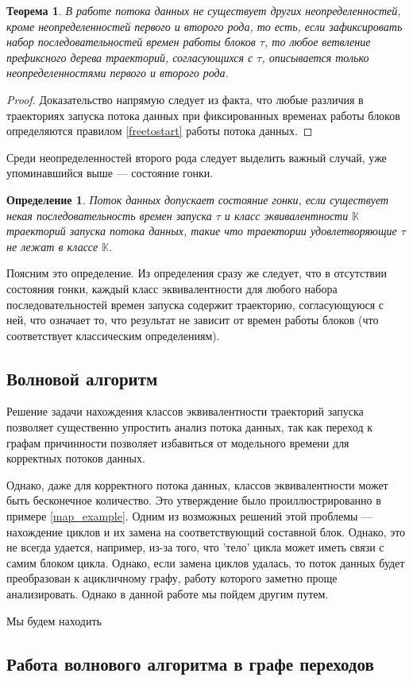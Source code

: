 \documentclass[10pt,a4paper]{article}
\newtheorem{defen}{Определение}
\newtheorem{theorem}{Теорема}
\begin{document}
  \begin{theorem}
    В работе потока данных не существует других неопределенностей, кроме неопределенностей первого и второго рода, то есть,
    если зафиксировать набор последовательностей времен работы блоков $\tau$, то любое ветвление префиксного дерева траекторий, согласующихся с $\tau$,
    описывается только неопределенностями первого и второго рода.
  \end{theorem}
  \begin{proof}
    Доказательство напрямую следует из факта, что любые различия в траекториях запуска потока данных при фиксированных временах работы блоков определяются
    правилом \eqref{freetostart} работы потока данных.
  \end{proof}
  
  Среди неопределенностей второго рода следует выделить важный случай, уже упоминавшийся выше --- состояние гонки.
  
  \begin{defen}
    Поток данных допускает состояние гонки, если существует некая последовательность времен запуска $\tau$ и класс эквивалентности $\mathbb{K}$
    траекторий запуска потока данных, такие что траектории удовлетворяющие $\tau$ не лежат в классе $\mathbb{K}$.
  \end{defen}
  
  Поясним это определение. Из определения сразу же следует, что в отсутствии состояния гонки, каждый класс эквивалентности для любого набора последовательностей
  времен запуска содержит траекторию, согласующуюся с ней, что означает то,
  что результат не зависит от времен работы блоков (что соответствует классическим определениям).
  
\subsection{Волновой алгоритм}  
  Решение задачи нахождения классов эквивалентности траекторий запуска позволяет существенно упростить анализ потока данных, так как
  переход к графам причинности позволяет избавиться от модельного времени для корректных потоков данных.
  
  Однако, даже для корректного потока данных, классов эквивалентности может быть бесконечное количество. Это утверждение было проиллюстрированно в примере \ref{map_example}.
  Одним из возможных решений этой проблемы --- нахождение циклов и их замена на соответствующий составной блок. Однако, это не всегда удается, например,
  из-за того, что 'тело' цикла может иметь связи с самим блоком цикла. Однако, если замена циклов удалась, то поток данных будет преобразован к ацикличному графу,
  работу которого заметно проще анализировать. Однако в данной работе мы пойдем другим путем.
  
  Мы будем находить 

\subsection{Работа волнового алгоритма в графе переходов}
\end{document}
